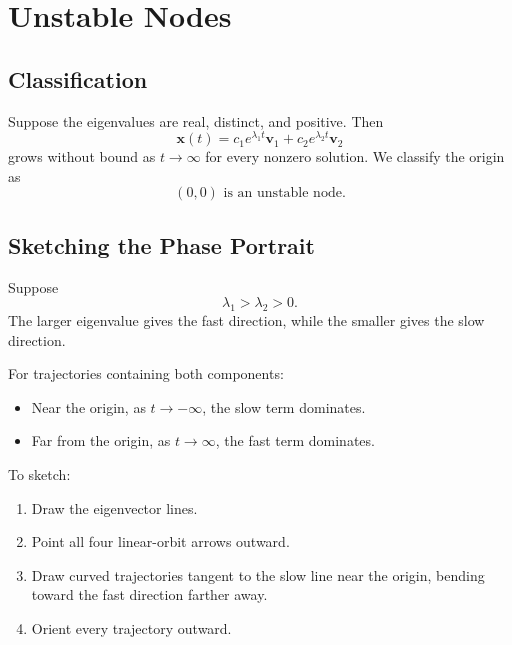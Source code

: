 \documentclass[10pt,letterpaper]{article}
\begin{document}
\section{Unstable Nodes}

\subsection{Classification}

Suppose the eigenvalues are real, distinct, and positive.
Then
\[
\mathbf{x}(t)
=c_1e^{\lambda_1t}\mathbf{v}_1
+c_2e^{\lambda_2t}\mathbf{v}_2
\]
grows without bound as $t\to\infty$ for every
nonzero solution. We classify the origin as
\[
\boxed{(0,0)\text{ is an unstable node.}}
\]

\subsection{Sketching the Phase Portrait}

Suppose
\[
\lambda_1>\lambda_2>0.
\]
The larger eigenvalue gives the fast direction,
while the smaller gives the slow direction.

For trajectories containing both components:
\begin{itemize}
    \item Near the origin, as $t\to-\infty$, the
    slow term dominates.
    \item Far from the origin, as $t\to\infty$,
    the fast term dominates.
\end{itemize}

To sketch:
\begin{enumerate}
    \item Draw the eigenvector lines.
    \item Point all four linear-orbit arrows outward.
    \item Draw curved trajectories tangent to the
    slow line near the origin, bending toward the
    fast direction farther away.
    \item Orient every trajectory outward.
\end{enumerate}
\end{document}
